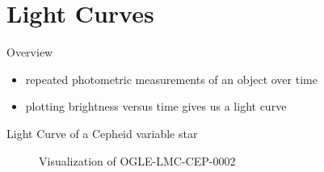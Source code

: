 \documentclass{beamer}
\begin{document}
\section{Light Curves}

\begin{frame}{Overview}
  \begin{itemize}
  \item repeated photometric measurements of an object over time
  \item plotting brightness versus time gives us a light curve
  \end{itemize}
\end{frame}

\begin{frame}{Light Curve of a Cepheid variable star}
  \begin{figure}[h]
    \centering
    \caption*{Visualization of OGLE-LMC-CEP-0002}
  \end{figure}
\end{frame}
\end{document}

